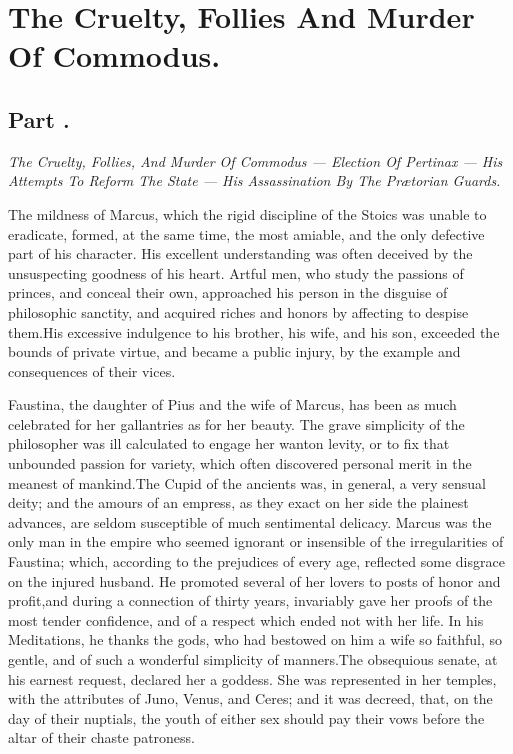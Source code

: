 \chapter{The Cruelty, Follies And Murder Of Commodus.}
\section{Part \thesection.}

\textit{The Cruelty, Follies, And Murder Of Commodus — Election Of
Pertinax — His Attempts To Reform The State — His Assassination By The
Prætorian Guards.}
\vspace{\onelineskip}

The mildness of Marcus, which the rigid discipline of the Stoics
was unable to eradicate, formed, at the same time, the most
amiable, and the only defective part of his character. His
excellent understanding was often deceived by the unsuspecting
goodness of his heart. Artful men, who study the passions of
princes, and conceal their own, approached his person in the
disguise of philosophic sanctity, and acquired riches and honors
by affecting to despise them.\footnotemark[1] His excessive indulgence to his
brother, \footnotemark[105] his wife, and his son, exceeded the bounds of
private virtue, and became a public injury, by the example and
consequences of their vices.



Faustina, the daughter of Pius and the wife of Marcus, has been
as much celebrated for her gallantries as for her beauty. The
grave simplicity of the philosopher was ill calculated to engage
her wanton levity, or to fix that unbounded passion for variety,
which often discovered personal merit in the meanest of mankind.\footnotemark[2]
The Cupid of the ancients was, in general, a very sensual
deity; and the amours of an empress, as they exact on her side
the plainest advances, are seldom susceptible of much sentimental
delicacy. Marcus was the only man in the empire who seemed
ignorant or insensible of the irregularities of Faustina; which,
according to the prejudices of every age, reflected some disgrace
on the injured husband. He promoted several of her lovers to
posts of honor and profit,\footnotemark[3] and during a connection of thirty
years, invariably gave her proofs of the most tender confidence,
and of a respect which ended not with her life. In his
Meditations, he thanks the gods, who had bestowed on him a wife
so faithful, so gentle, and of such a wonderful simplicity of
manners.\footnotemark[4] The obsequious senate, at his earnest request,
declared her a goddess. She was represented in her temples, with
the attributes of Juno, Venus, and Ceres; and it was decreed,
that, on the day of their nuptials, the youth of either sex
should pay their vows before the altar of their chaste patroness.\footnotemark[5]

